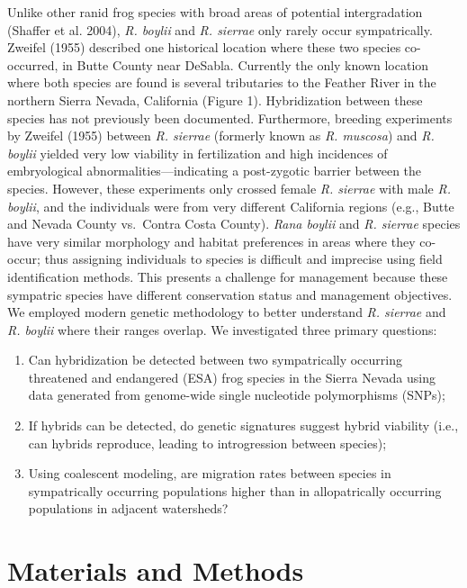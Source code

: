 \documentclass[twoside,12pt,final]{ucthesis-CA2012} %
\providecommand{\tightlist}{%
  \setlength{\itemsep}{0pt}\setlength{\parskip}{0pt}}
\begin{document}
\begin{ucmainmatter}
Unlike other ranid frog species with broad areas of potential
intergradation (Shaffer et al. 2004), \emph{R. boylii} and \emph{R.
sierrae} only rarely occur sympatrically. Zweifel (1955) described one
historical location where these two species co-occurred, in Butte County
near DeSabla. Currently the only known location where both species are
found is several tributaries to the Feather River in the northern Sierra
Nevada, California (Figure 1). Hybridization between these species has
not previously been documented. Furthermore, breeding experiments by
Zweifel (1955) between \emph{R. sierrae} (formerly known as \emph{R.
muscosa}) and \emph{R. boylii} yielded very low viability in
fertilization and high incidences of embryological
abnormalities---indicating a post-zygotic barrier between the species.
However, these experiments only crossed female \emph{R. sierrae} with
male \emph{R. boylii}, and the individuals were from very different
California regions (e.g., Butte and Nevada County vs.~Contra Costa
County). \emph{Rana boylii} and \emph{R. sierrae} species have very
similar morphology and habitat preferences in areas where they co-occur;
thus assigning individuals to species is difficult and imprecise using
field identification methods. This presents a challenge for management
because these sympatric species have different conservation status and
management objectives. We employed modern genetic methodology to better
understand \emph{R. sierrae} and \emph{R. boylii} where their ranges
overlap. We investigated three primary questions:
\begin{enumerate}
\def\labelenumi{\arabic{enumi}.}
\tightlist
\item
  Can hybridization be detected between two sympatrically occurring
  threatened and endangered (ESA) frog species in the Sierra Nevada
  using data generated from genome-wide single nucleotide polymorphisms
  (SNPs);
\item
  If hybrids can be detected, do genetic signatures suggest hybrid
  viability (i.e., can hybrids reproduce, leading to introgression
  between species);
\item
  Using coalescent modeling, are migration rates between species in
  sympatrically occurring populations higher than in allopatrically
  occurring populations in adjacent watersheds?
\end{enumerate}
\hypertarget{materials-and-methods}{%
\section{Materials and Methods}\label{materials-and-methods}}


\end{ucmainmatter}
\end{document}
